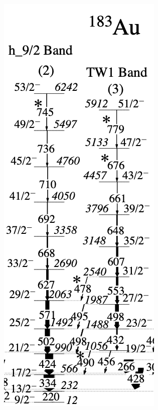 \documentclass[12pt, a4paper]{article}
\begin{document}
\begin{figure}[ht]
    \centering
    \includegraphics[scale=0.25]{figs/negative_Au183.png}\hspace{3cm}

\end{figure}
\end{document}
